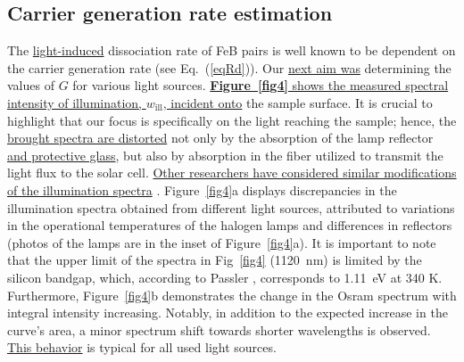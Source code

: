 \documentclass{WileyMSP-template}
\begin{document}
\subsection{Carrier generation rate estimation}\label{SecG}

The \textcolor[rgb]{0.00,0.07,1.00}{\uline{light-induced}} dissociation rate of FeB pairs is well known
to be dependent on the carrier generation rate (see Eq.~(\ref{eqRd})).
Our \textcolor[rgb]{0.00,0.07,1.00}{\uline{next aim was}} determining the values of $G$ for various light sources.
\textcolor[rgb]{0.00,0.07,1.00}{\uline{\textbf{Figure~\ref{fig4}} shows the measured spectral intensity of illumination, $w_\mathrm{ill}$, incident onto}} the sample surface.
It is crucial to highlight that our focus is specifically on the light reaching the sample;
hence, the \textcolor[rgb]{0.00,0.07,1.00}{\uline{brought spectra are distorted}} not only by the absorption of the lamp reflector
\textcolor[rgb]{0.00,0.07,1.00}{\uline{and protective glass}}, but also by absorption in the fiber
utilized to transmit the light flux to the solar cell.
\textcolor[rgb]{0.00,0.07,1.00}{\uline{Other researchers have considered similar modifications of the illumination spectra}} \cite{Libra2017}.
Figure~\ref{fig4}a displays discrepancies in the illumination spectra obtained from different light sources,
attributed to variations in the operational temperatures of the halogen lamps and differences in reflectors
(photos of the lamps are in the inset of Figure~\ref{fig4}a).
It is important to note that the upper limit of the spectra in Fig~\ref{fig4} (1120~nm)
is limited by the silicon bandgap, which, according to Passler \cite{Pasler}, corresponds to 1.11~eV at 340 K.
Furthermore, Figure~\ref{fig4}b demonstrates the change in the Osram spectrum with integral intensity increasing.
Notably, in addition to the expected increase in the curve's area, a minor spectrum shift towards shorter wavelengths is observed.
\textcolor[rgb]{0.00,0.07,1.00}{\uline{This behavior}} is typical for all used light sources.
\end{document}

